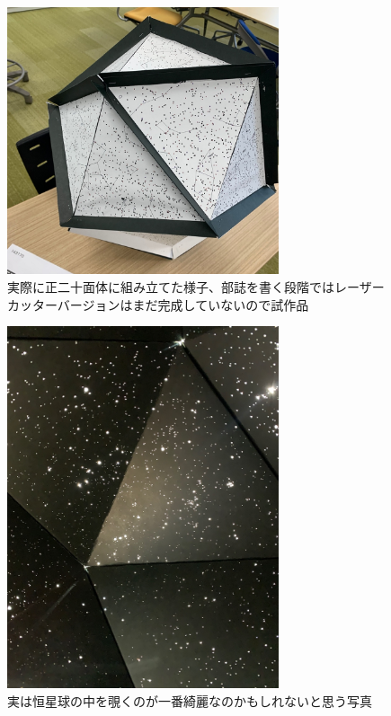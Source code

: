 \documentclass[supernova_2023]{subfiles}
\begin{document}
\begin{figure}[H]
  \centering
  \includegraphics[width=8cm]{figures/Nakahara/fig4.png}
  \caption{\footnotesize 実際に正二十面体に組み立てた様子、部誌を書く段階ではレーザーカッターバージョンはまだ完成していないので試作品}
  \label{fig:4}
\end{figure}
\begin{figure}[H]
  \centering
  \includegraphics[width=8cm]{figures/Nakahara/fig5.png}
  \caption{\footnotesize 実は恒星球の中を覗くのが一番綺麗なのかもしれないと思う写真}
  \label{fig:5}
\end{figure}
\end{document}
